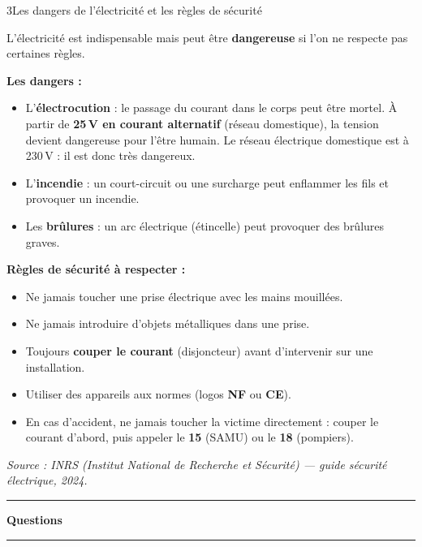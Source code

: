 \documentclass[11pt,a4paper]{article}
\begin{document}
\begin{docdoc}{3}{Les dangers de l'électricité et les règles de sécurité}

L'électricité est indispensable mais peut être \textbf{dangereuse} si l'on ne respecte pas certaines règles.

\textbf{Les dangers :}
\begin{itemize}
  \item L'\textbf{électrocution} : le passage du courant dans le corps peut être mortel. À partir de \textbf{25\,V en courant alternatif} (réseau domestique), la tension devient dangereuse pour l'être humain. Le réseau électrique domestique est à 230\,V : il est donc très dangereux.
  \item L'\textbf{incendie} : un court-circuit ou une surcharge peut enflammer les fils et provoquer un incendie.
  \item Les \textbf{brûlures} : un arc électrique (étincelle) peut provoquer des brûlures graves.
\end{itemize}

\textbf{Règles de sécurité à respecter :}
\begin{itemize}
  \item Ne jamais toucher une prise électrique avec les mains mouillées.
  \item Ne jamais introduire d'objets métalliques dans une prise.
  \item Toujours \textbf{couper le courant} (disjoncteur) avant d'intervenir sur une installation.
  \item Utiliser des appareils aux normes (logos \textbf{NF} ou \textbf{CE}).
  \item En cas d'accident, ne jamais toucher la victime directement : couper le courant d'abord, puis appeler le \textbf{15} (SAMU) ou le \textbf{18} (pompiers).
\end{itemize}

\footnotesize\textit{Source : INRS (Institut National de Recherche et Sécurité) --- guide sécurité électrique, 2024.}
\normalsize

\end{docdoc}

\vspace{5mm}

\hrule
\vspace{3mm}
{\Large\textbf{Questions}}
\vspace{3mm}
\hrule
\vspace{5mm}
\end{document}
